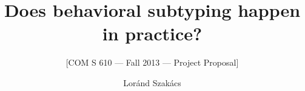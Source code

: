 \documentclass{acm_proc_article-sp}
\begin{document}
\title{Does behavioral subtyping happen in practice?}
\subtitle{[COM S 610 --- Fall 2013 --- Project Proposal]}
%
%
%
%
%

%
\author{
%
%
\alignauthor
Lor\'{a}nd Szak\'{a}cs\\
       \\
}

\maketitle
\end{document}
